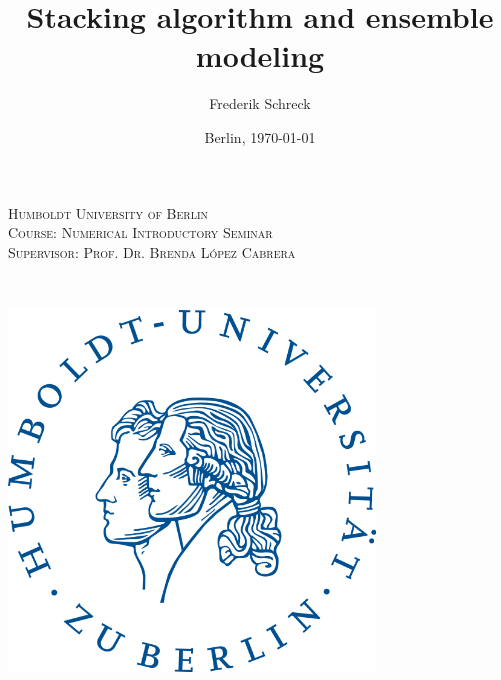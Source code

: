 \documentclass[12pt]{article}
\title{Stacking algorithm and ensemble modeling}
\author{Frederik Schreck}
\date{Berlin, \today}
\begin{document}

\begin{titlepage} %
	\newcommand{\HRule}{\rule{\linewidth}{0.5mm}} %
	


	\begin{minipage}{0.77\textwidth}
		\begin{flushleft}
			\large
			\textsc{Humboldt University of Berlin\\
			Course: Numerical Introductory Seminar\\
			Supervisor: Prof. Dr. Brenda L\'opez Cabrera\\}
		\end{flushleft}
	\end{minipage}
		~
	\begin{minipage}{0.2\textwidth}
		\begin{flushleft}
		\includegraphics[width=0.73\textwidth]{graphs/HU_logo.png}\\
		\end{flushleft}
	\end{minipage}
	
	\vspace{2cm}


\end{titlepage}
\end{document}
